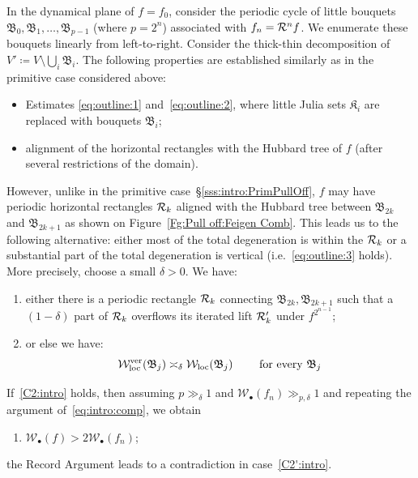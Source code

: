 \documentclass{amsart}
\newcommand{\filled}{{\mathfrak K }}
\newcommand{\bush}{{\mathfrak B }}
\renewcommand{\sp}{{\ \ }}
\newcommand{\1}{{\mathbb 1 }}
\newcommand{\Width}{{\mathcal W}}
\begin{document}
In the dynamical plane of $f=f_0$, consider the periodic cycle of little bouquets  $\bush_0,\bush_1,\dots, \bush_{p-1}$ (where $p=2^n$) associated with $f_n={\mathcal R}^n f$. We enumerate these bouquets linearly from left-to-right. Consider the thick-thin decomposition of $V'\coloneqq V\setminus \bigcup_i \bush_i$. The following properties are established similarly as in the primitive case considered above:
\begin{itemize}
\item Estimates \eqref{eq:outline:1} and~\eqref{eq:outline:2}, where little Julia sets $\filled_i$ are replaced with bouquets $\bush_i$;
\item alignment of the  horizontal rectangles
with the Hubbard tree of $f$ (after several restrictions of the domain).
\end{itemize}

However, unlike in the primitive case~\S\ref{sss:intro:PrimPullOff},
$f$ may have periodic horizontal rectangles ${\mathcal R}_k$ aligned with the Hubbard tree between $\bush_{2k}$ and $\bush_{2k+1}$ as shown on Figure~\ref{Fg:Pull off:Feigen Comb}. This leads us to the following alternative: either most of the total degeneration is within the ${\mathcal R}_k$ or a substantial part of the total degeneration is vertical (i.e.~\eqref{eq:outline:3} holds). More precisely, choose a small $\delta>0$. We have: 
\begin{enumerate}[label=\text{(\Roman*)},font=\normalfont,leftmargin=*]
\item \label{C1:intro}either there is a periodic rectangle ${\mathcal R}_k$ connecting $\bush_{2k},\bush_{2k+1}$ such that a $(1-\delta)$ part of ${\mathcal R}_k$ overflows its iterated lift ${\mathcal R}'_k$ under $f^{2^{n-1}}$; 
\item \label{C2:intro} or else we have:
\[
\Width_\loc^\ver(\bush_j) \asymp_\delta \Width_\loc(\bush_j) \sp\sp\sp\text{ for every }\bush_j
\]
\end{enumerate}
If~\ref{C2:intro} holds, then assuming $p\gg_\delta 1$ and $\Width_\bullet(f_n)\gg_{p,\delta} 1$ and repeating the argument of~\eqref{eq:intro:comp}, we obtain 
\begin{enumerate}[label=\text{(\Roman*$'$)},start=2, font=\normalfont,leftmargin=*]
\item \label{C2':intro}\hspace{3cm} $\Width_\bullet(f)>2 \Width_\bullet(f_n)$;
\end{enumerate}
the Record Argument leads to a contradiction in case~\ref{C2':intro}. 
\end{document}
